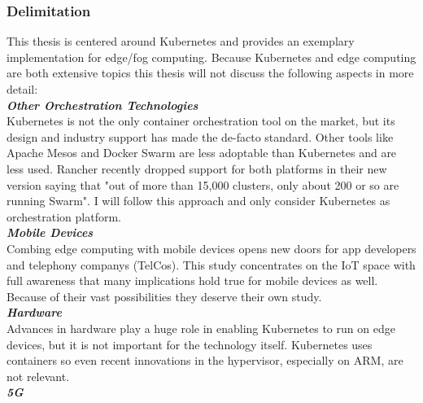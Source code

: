 \subsubsection{Delimitation} \label{sec:delimitation}
This thesis is centered around Kubernetes and provides an exemplary implementation for edge/fog computing. Because Kubernetes and edge computing are both extensive topics this thesis will not discuss the following aspects in more detail:\\[5mm]
\textbf{\textit{Other Orchestration Technologies}}\\
Kubernetes is not the only container orchestration tool on the market, but its design and industry support has made the de-facto standard. Other tools like Apache Mesos\cite{ApacheMesos19:online} and Docker Swarm\cite{DockerSwarmmod12:online} are less adoptable than Kubernetes and are less used. Rancher recently dropped support for both platforms in their new version saying that "out of more than 15,000 clusters, only about 200 or so are running Swarm"\cite{FAQ36RancherSwarmMesos:online}. I will follow this approach and only consider Kubernetes as orchestration platform.\\[5mm]
\textbf{\textit{Mobile Devices}}\\
Combing edge computing with mobile devices opens new doors for app developers and telephony companys (TelCos). This study concentrates on the IoT space with full awareness that many implications hold true for mobile devices as well. Because of their vast possibilities they deserve their own study.\\[5mm]
\textbf{\textit{Hardware}}\\
Advances in hardware play a huge role in enabling Kubernetes to run on edge devices, but it is not important for the technology itself. Kubernetes uses containers so even recent innovations in the hypervisor, especially on ARM, are not relevant.\\[5mm]
\textbf{\textit{5G}}\\
